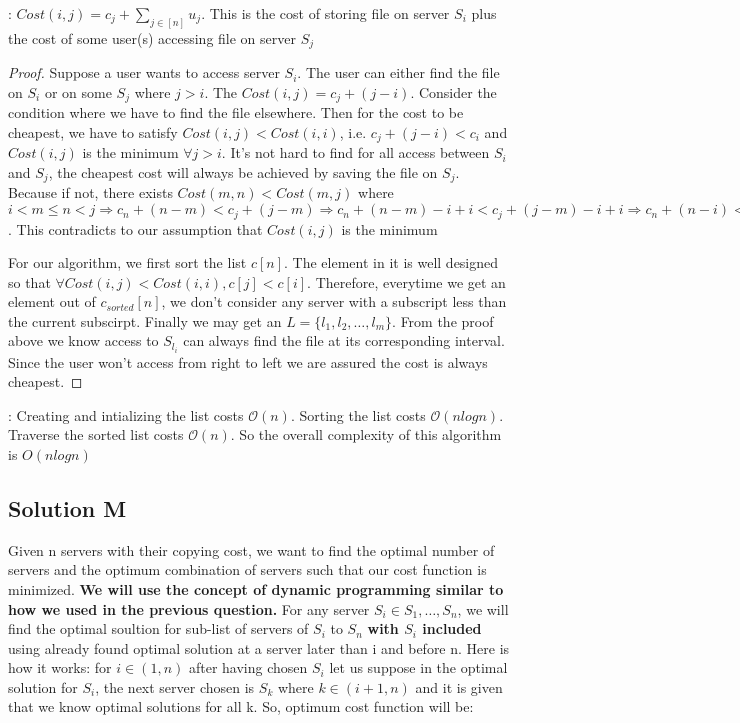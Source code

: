 \documentclass[11pt]{article}
\renewcommand{\O}{\mathcal{O}}
\begin{document}
{{: {\it $Cost(i, j) = c_j + \sum_{j \in [n]} u_j$}. This is the cost of storing file on server $S_i$ plus the cost of some user(s) accessing file on server $S_j$

\begin{proof}
  Suppose a user wants to access server $S_i$. The user can either find the file on $S_i$ or on some $S_j$ where $j > i$. The $Cost(i, j) = c_j + (j-i)$.
  Consider the condition where we have to find the file elsewhere. Then for the cost to be cheapest, we have to satisfy $Cost(i, j) < Cost(i, i)$, i.e. $c_j + (j-i) < c_i$ and $Cost(i, j)$ is the minimum $\forall j > i$. It's not hard to find for all access between $S_i$ and $S_j$, the cheapest cost will always be achieved by saving the file on $S_j$. Because if not, there exists $Cost(m, n) < Cost(m, j)$ where $i< m \leq n < j \Rightarrow c_n + (n-m) < c_j + (j-m) \Rightarrow c_n + (n-m) -i + i < c_j + (j-m) -i + i \Rightarrow c_n + (n-i) < c_j + (j-i) \Rightarrow Cost(i, n) < Cost(i, j)$. This contradicts to our assumption that $Cost(i, j)$ is the minimum

For our algorithm, we first sort the list $c[n]$. The element in it is well designed so that $\forall Cost(i, j) < Cost(i, i), c[j] < c[i]$. Therefore, everytime we get an element out of $c_{sorted}[n]$, we don't consider any server with a subscript less than the current subscirpt. Finally we may get an $L = \{l_1, l_2, \dots, l_m\}$. From the proof above we know access to $S_{l_i}$ can always find the file at its corresponding interval. Since the user won't access from right to left we are assured the cost is always cheapest.
\end{proof}

: Creating and intializing the list costs $\O(n)$. Sorting the list costs $\O(nlogn)$. Traverse the sorted list costs $\O(n)$. So the overall complexity of this algorithm is $O(nlogn)$

\subsection{Solution M}
Given n servers with their copying cost, we want to find the optimal number of servers and the optimum combination of servers
such that our cost function is minimized. \newline
{\bf We will use the concept of dynamic programming similar to how we used in the previous question.} \newline
For any server $S_i \in S_1, \dots , S_n$, we will find the optimal soultion for sub-list of servers of $S_i$
to $S_n$ {\bf with $S_i$ included}  using already found optimal solution at a server later than i and before n. \newline
Here is how it works:  \newline
for $i \in (1,n)$ after having chosen $S_i$ let us suppose in the optimal solution for $S_i$, the next server chosen is $S_k$
where $k \in (i+1 , n)$ and it is given that we know optimal solutions for all k.  \newline
So, optimum cost function will be: \newline

}}
\end{document}
